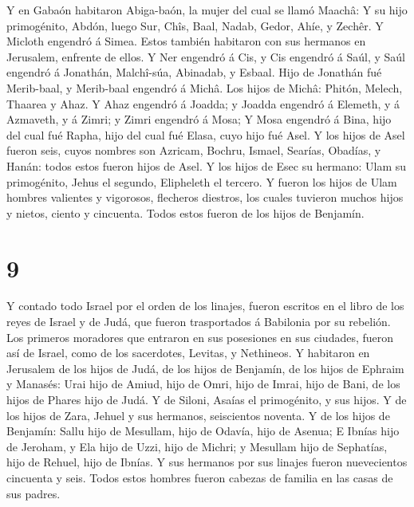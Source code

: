  Y en Gabaón habitaron Abiga-baón, la mujer del cual se
llamó Maachâ:  Y su hijo primogénito, Abdón, luego Sur,
Chîs, Baal, Nadab,  Gedor, Ahíe, y Zechêr.  Y
Micloth engendró á Simea. Estos también habitaron con sus hermanos en
Jerusalem, enfrente de ellos.  Y Ner engendró á Cis, y Cis
engendró á Saúl, y Saúl engendró á Jonathán, Malchî-súa, Abinadab, y
Esbaal.  Hijo de Jonathán fué Merib-baal, y Merib-baal
engendró á Michâ.  Los hijos de Michâ: Phitón, Melech,
Thaarea y Ahaz.  Y Ahaz engendró á Joadda; y Joadda
engendró á Elemeth, y á Azmaveth, y á Zimri; y Zimri engendró á Mosa;
 Y Mosa engendró á Bina, hijo del cual fué Rapha, hijo del
cual fué Elasa, cuyo hijo fué Asel.  Y los hijos de Asel
fueron seis, cuyos nombres son Azricam, Bochru, Ismael, Searías,
Obadías, y Hanán: todos estos fueron hijos de Asel.  Y los
hijos de Esec su hermano: Ulam su primogénito, Jehus el segundo,
Elipheleth el tercero.  Y fueron los hijos de Ulam hombres
valientes y vigorosos, flecheros diestros, los cuales tuvieron muchos
hijos y nietos, ciento y cincuenta. Todos estos fueron de los hijos de
Benjamín.

\hypertarget{section-8}{%
\section{9}\label{section-8}}

 Y contado todo Israel por el orden de los linajes, fueron
escritos en el libro de los reyes de Israel y de Judá, que fueron
trasportados á Babilonia por su rebelión.  Los primeros
moradores que entraron en sus posesiones en sus ciudades, fueron así de
Israel, como de los sacerdotes, Levitas, y Nethineos.  Y
habitaron en Jerusalem de los hijos de Judá, de los hijos de Benjamín,
de los hijos de Ephraim y Manasés:  Urai hijo de Amiud, hijo
de Omri, hijo de Imrai, hijo de Bani, de los hijos de Phares hijo de
Judá.  Y de Siloni, Asaías el primogénito, y sus hijos.
 Y de los hijos de Zara, Jehuel y sus hermanos, seiscientos
noventa.  Y de los hijos de Benjamín: Sallu hijo de
Mesullam, hijo de Odavía, hijo de Asenua;  E Ibnías hijo de
Jeroham, y Ela hijo de Uzzi, hijo de Michri; y Mesullam hijo de
Sephatías, hijo de Rehuel, hijo de Ibnías.  Y sus hermanos
por sus linajes fueron nuevecientos cincuenta y seis. Todos estos
hombres fueron cabezas de familia en las casas de sus padres.

